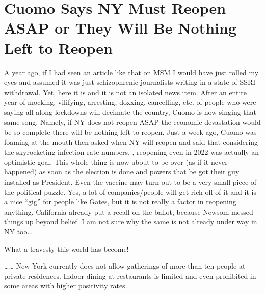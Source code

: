 \chapter{Cuomo Says NY Must Reopen ASAP or They Will Be Nothing Left to Reopen}

\begin{refsection}

A year ago, if I had seen an article like that on MSM I would have just rolled my eyes and assumed it was just schizophrenic journalists writing in a state of SSRI withdrawal. Yet, here it is and it is not an isolated news item. After an entire year of mocking, vilifying, arresting, doxxing, cancelling, etc. of people who were saying all along lockdowns will decimate the country, Cuomo is now singing that same song. Namely, if NY does not reopen ASAP the economic devastation would be so complete there will be nothing left to reopen. Just a week ago, Cuomo was foaming at the mouth then asked when NY will reopen and said that considering the skyrocketing infection rate numbers, , reopening even in 2022 was actually an optimistic goal. This whole thing is now about to be over (as if it never happened) as soon as the election is done and powers that be got their guy installed as President. Even the vaccine may turn out to be a very small piece of the political puzzle. Yes, a lot of companies/people will get rich off of it and it is a nice \enquote{gig} for people like Gates, but it is not really a factor in reopening anything. California already put a recall on the ballot, because Newsom messed things up beyond belief. I am not sure why the same is not already under way in NY too\dots{}

What a travesty this world has become!

\begin{tcolorbox}[quote]

\dots{}\dots{} New York currently does not allow gatherings of more than ten people at private residences. Indoor dining at restaurants is limited and even prohibited in some areas with higher positivity rates.\textsuperscript{\cite{urlas09dfyu}}

\end{tcolorbox}


\printbibliography[heading=subbibliography]

\end{refsection}